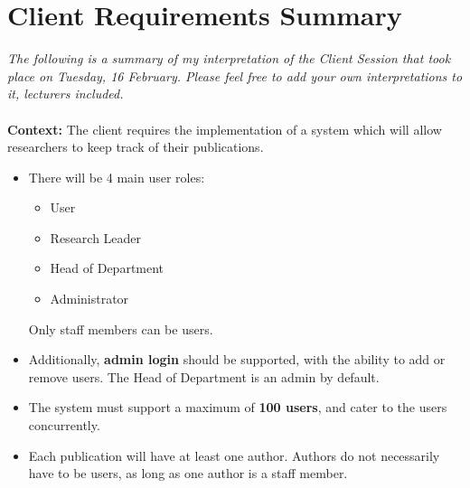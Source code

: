 \documentclass[a4paper,12pt]{article}
\begin{document}
\section{Client Requirements Summary}

\textit{The following is a summary of my interpretation of the Client Session that took place on Tuesday, 16 February. Please feel free to add your own interpretations to it, lecturers included.}\\
\\
\textbf{Context: } The client requires the implementation of a system which will allow researchers to keep track of their publications. 

\begin{itemize}

\item There will be 4 main user roles:
\begin{itemize}
\item User
\item Research Leader
\item Head of Department
\item Administrator
\end{itemize}
Only staff members can be users.

\item Additionally, \textbf{admin login} should be supported, with the ability to add or remove users. The Head of Department is an admin by default.

\item The system must support a maximum of \textbf{100 users}, and cater to the users concurrently.

\item Each publication will have at least one author. Authors do not necessarily have to be users, as long as one author is a staff member.


\end{itemize}
\end{document}

